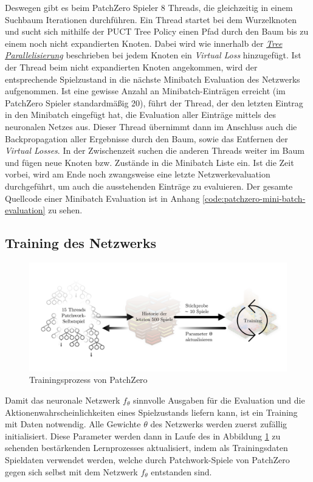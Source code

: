 Deswegen gibt es beim PatchZero Spieler 8 Threads, die gleichzeitig in einem Suchbaum Iterationen durchführen. Ein Thread startet bei dem Wurzelknoten und sucht sich mithilfe der PUCT Tree Policy einen Pfad durch den Baum bis zu einem noch nicht expandierten Knoten. Dabei wird wie innerhalb der \hyperref[text:tree-parallelization]{\emph{Tree Parallelisierung}} beschrieben bei jedem Knoten ein \emph{Virtual Loss} hinzugefügt. Ist der Thread beim nicht expandierten Knoten angekommen, wird der entsprechende Spielzustand in die nächste Minibatch Evaluation des Netzwerks aufgenommen. Ist eine gewisse Anzahl an Minibatch-Einträgen erreicht (im PatchZero Spieler standardmäßig 20), führt der Thread, der den letzten Eintrag in den Minibatch eingefügt hat, die Evaluation aller Einträge mittels des neuronalen Netzes aus. Dieser Thread übernimmt dann im Anschluss auch die Backpropagation aller Ergebnisse durch den Baum, sowie das Entfernen der \emph{Virtual Losses}. In der Zwischenzeit suchen die anderen Threads weiter im Baum und fügen neue Knoten bzw. Zustände in die Minibatch Liste ein. Ist die Zeit vorbei, wird am Ende noch zwangsweise eine letzte Netzwerkevaluation durchgeführt, um auch die ausstehenden Einträge zu evaluieren. Der gesamte Quellcode einer Minibatch Evaluation ist in Anhang \ref{code:patchzero-mini-batch-evaluation} zu sehen.

\subsection{Training des Netzwerks}

\begin{figure}[!ht]
    \centering
    \includegraphics[width=\textwidth]{res/pictures/patch-zero-train.png}
    \caption{Trainingsprozess von PatchZero}
    \label{fig:patch-zero-train}
\end{figure}

Damit das neuronale Netzwerk $f_\theta$ sinnvolle Ausgaben für die Evaluation und die Aktionenwahrscheinlichkeiten eines Spielzustands liefern kann, ist ein Training mit Daten notwendig. Alle Gewichte $\theta$ des Netzwerks werden zuerst zufällig initialisiert. Diese Parameter werden dann in Laufe des in Abbildung \ref{fig:patch-zero-train} zu sehenden bestärkenden Lernprozesses aktualisiert, indem als Trainingsdaten Spieldaten verwendet werden, welche durch Patchwork-Spiele von PatchZero gegen sich selbst mit dem Netzwerk $f_\theta$ entstanden sind.

